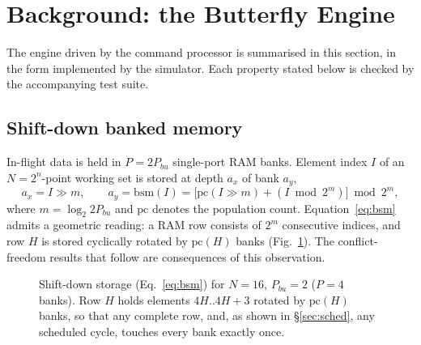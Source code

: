 \documentclass[twocolumn,10pt]{article}
\newcommand{\bsm}{\mathrm{bsm}}
\newcommand{\Pbu}{P_{bu}}
\begin{document}
\section{Background: the Butterfly Engine}\label{sec:engine}

The engine driven by the command processor is summarised in this section, in
the form implemented by the simulator.  Each property stated below is checked by
the accompanying test suite.

\subsection{Shift-down banked memory}\label{sec:mem}

In-flight data is held in $P = 2\Pbu$ single-port RAM banks.  Element index $I$
of an $N = 2^n$-point working set is stored at depth $a_x$ of bank $a_y$,
\begin{equation}
a_x = I \gg m,\qquad
a_y = \bsm(I) = \big[\mathrm{pc}(I \gg m) + (I \bmod 2^m)\big] \bmod 2^m,
\label{eq:bsm}
\end{equation}
where $m = \log_2 2\Pbu$ and $\mathrm{pc}$ denotes the population count.
Equation~\ref{eq:bsm} admits a geometric reading: a RAM row consists of $2^m$
consecutive indices, and row $H$ is stored cyclically rotated by $\mathrm{pc}(H)$
banks (Fig.~\ref{fig:memory}).  The conflict-freedom results that follow are
consequences of this observation.

\begin{figure}[t]
\centering
{}
\caption{Shift-down storage (Eq.~\ref{eq:bsm}) for $N{=}16$, $\Pbu{=}2$
($P{=}4$ banks).  Row $H$ holds elements $4H..4H{+}3$ rotated by
$\mathrm{pc}(H)$ banks, so that any complete row, and, as shown in
\S\ref{sec:sched}, any scheduled cycle, touches every bank exactly once.}
\label{fig:memory}
\end{figure}
\end{document}
